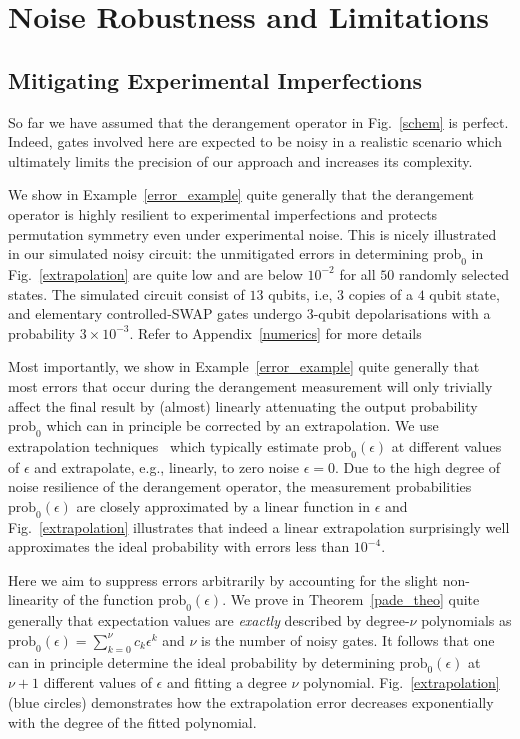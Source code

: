 \documentclass[aps,prx,showpacs,twocolumn,reprint]{revtex4-2}
\newcommand{\prob}{\mathrm{prob}_0}
\begin{document}
{\section{Noise Robustness and Limitations}
\subsection{Mitigating Experimental Imperfections}

So far we have assumed that the
derangement operator in Fig.~\ref{schem} is perfect. Indeed, gates involved here are expected
to be noisy in a realistic
scenario which ultimately limits the precision of our approach and increases its complexity.

We show in Example~\ref{error_example} quite generally that the
derangement operator is highly resilient to experimental imperfections
and protects permutation symmetry even under experimental noise.
This is nicely illustrated in our simulated noisy circuit: the unmitigated errors in determining $\prob$ in Fig.~\ref{extrapolation} are quite low and
are below $10^{-2}$ for all $50$ randomly selected states.
The simulated circuit consist of $13$ qubits, i.e, $3$ copies
of a $4$ qubit state, and elementary controlled-SWAP gates undergo 3-qubit depolarisations
with a probability $3 \times 10^{-3}$.
Refer to Appendix~\ref{numerics} for more details

Most importantly, we show  in Example~\ref{error_example} quite generally that most errors
that occur during the derangement measurement
will only trivially affect the final result by (almost) linearly attenuating the
output probability $\prob$ which can in principle be corrected by an
extrapolation.
We use extrapolation techniques~\cite{endo2020hybrid,Li2017,PhysRevX.8.031027, kandala2018extending,PhysRevLett.119.180509,cai2020multi} which typically estimate 
$\prob(\epsilon)$ at different values of $\epsilon$ and extrapolate, e.g., linearly, to
zero noise $\epsilon = 0$. Due to the high degree of noise resilience of the derangement operator, 
the measurement probabilities $\prob(\epsilon)$ are closely approximated
by a linear function in $\epsilon$ and Fig.~\ref{extrapolation}
illustrates that indeed a linear extrapolation surprisingly well approximates the ideal
probability with errors less than $10^{-4}$. 

Here we aim to suppress errors arbitrarily by accounting for the slight non-linearity of the
function $\prob(\epsilon)$.
We prove in Theorem~\ref{pade_theo} quite generally that expectation values
are \emph{exactly} described by degree-$\nu$ polynomials
as $\prob(\epsilon) = \sum_{k=0}^\nu c_k \epsilon^k$
and $\nu$ is the number of noisy gates. It follows that one can in principle determine
the ideal probability by determining
$\prob(\epsilon)$ at $\nu+1$ different values of $\epsilon$
and fitting a degree $\nu$ polynomial.
Fig.~\ref{extrapolation} (blue circles) demonstrates how the
extrapolation error decreases exponentially with the degree of the fitted
polynomial.


}
\end{document}
